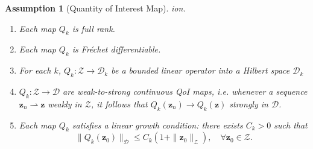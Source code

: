 \documentclass[final,1p,times]{elsarticle}
\newtheorem{assumption}{Assumption}
\begin{document}
\begin{assumption}[Quantity of Interest Map]
ion.
\begin{enumerate}
\item Each map $ Q_k $ is full rank. \label{ass:qoi_map_1}
\item Each map $ Q_k $ is Fréchet differentiable. \label{ass:qoi_map_2}
\item For each $k$, $ Q_k : \mathcal{Z} \to \mathcal{D}_k $ be a bounded linear operator into a Hilbert space $ \mathcal{D}_k $\label{ass:qoi_map_3}
\item $ Q_k : \mathcal{Z} \to \mathcal{D} $ are weak-to-strong continuous QoI maps, i.e. whenever a sequence $\mathbf{z}_n \rightharpoonup \mathbf{z}$ weakly in $\mathcal{Z}$, it follows that $Q_k\left(\mathbf{z}_n\right) \rightarrow Q_k(\mathbf{z})$ strongly in $\mathcal{D}$.\label{ass:qoi_map_4}
\item Each map $ Q_k $ satisfies a linear growth condition: there exists $ C_k > 0 $ such that
\begin{equation}\label{ass:qoi_map_5}
\| Q_k(\mathbf{z}_0) \|_{\mathcal{D}} \leq C_k (1 + \| \mathbf{z}_0 \|_{\mathcal{Z}}), \quad \forall \mathbf{z}_0 \in \mathcal{Z}.
\end{equation}
\end{enumerate}
\end{assumption}
\end{document}
